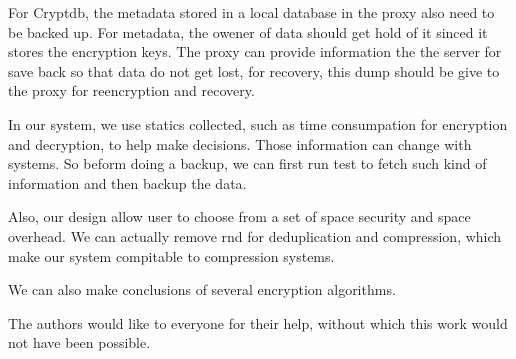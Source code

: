 For Cryptdb, the metadata stored in a local database in the proxy also need to be backed up. For metadata, the owener of data should get hold of it sinced it stores the encryption keys. The proxy can provide information the the server for save back so that data do not get lost, for recovery, this dump should be give to the proxy for reencryption and recovery.


In our system, we use statics collected, such as time consumpation for encryption and decryption, to help make decisions. Those information can change with systems. So beform doing a backup, we can first run test to fetch such kind of information and then backup the data.

Also, our design allow user to choose from a set of space security and space overhead. We can actually remove rnd for deduplication and compression, which make our system compitable to compression systems.

We can also make conclusions of several encryption algorithms.


\begin{acks}
  The authors would like to everyone for their help, without which this work would not have been possible. 
\end{acks}


